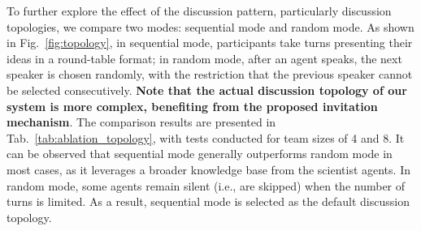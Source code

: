 \documentclass[11pt]{article}
\begin{document}
To further explore the effect of the discussion pattern, particularly discussion topologies, we compare two modes: sequential mode and random mode. As shown in Fig.~\ref{fig:topology}, in sequential mode, participants take turns presenting their ideas in a round-table format; in random mode, after an agent speaks, the next speaker is chosen randomly, with the restriction that the previous speaker cannot be selected consecutively. \textbf{Note that the actual discussion topology of our system is more complex, benefiting from the proposed invitation mechanism}. The comparison results are presented in Tab.~\ref{tab:ablation_topology}, with tests conducted for team sizes of 4 and 8. It can be observed that sequential mode generally outperforms random mode in most cases, as it leverages a broader knowledge base from the scientist agents. In random mode, some agents remain silent (i.e., are skipped) when the number of turns is limited. As a result, sequential mode is selected as the default discussion topology.


\end{document}
